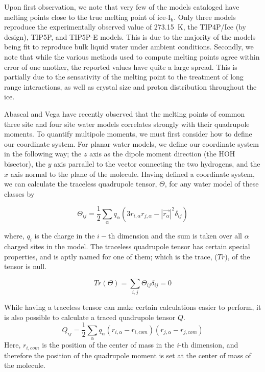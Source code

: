 Upon first observation, we note that very few of the models cataloged
have melting points close to the true melting point of
ice-I$_\mathrm{h}$.  Only three models reproduce the experimentally
observed value of 273.15~K, the TIP4P/Ice (by design), TIP5P, and
TIP5P-E models. This is due to the majority of the models being fit to
reproduce bulk liquid water under ambient conditions. Secondly, we note
that while the various methods used to compute melting points agree
within error of one another, the reported values have quite a large
spread. This is partially due to the sensativity of the melting point
to the treatment of long range interactions\cite{Arbuckle2002,
  Bryk2004}, as well as crystal size\cite{Pan2011} and proton
distribution throughout the ice.\cite{Louden2017}

Abascal and Vega have recently observed that the melting points of
common three site and four site water models correlates strongly with
their quadrupole
moments.\cite{Abascal2007,Abascal2007a,Abascal2007b,Abascal2007c} To
quantify multipole moments, we must first consider how to define our
coordinate system. For planar water models, we define our coordinate
system in the following way; the $z$ axis as the dipole moment
direction (the HOH bisector), the $y$ axis parrallel to the vector
connecting the two hydrogens, and the $x$ axis normal to the plane of
the molecule. Having defined a coordinate system, we can calculate the
traceless quadrupole tensor, $\Theta$, for any water model of these
classes by

\begin{equation}
\Theta_{ij} = \frac{1}{2} \sum_{\alpha}q_{\alpha}(3r_{i,\alpha}r_{j,\alpha}-|\vec{r_{\alpha}}|^{2}\delta_{ij})
\end{equation}

where, $q_i$ is the charge in the $i-$th dimension and the sum is
taken over all $\alpha$ charged sites in the model. The traceless
quadrupole tensor has certain special properties, and is aptly named
for one of them; which is the trace, ($Tr$), of the tensor is null.

\begin{equation}
Tr(\Theta) = \sum_{i,j}\Theta_{ij}\delta_{ij} = 0
\end{equation}

While having a traceless tensor can make certain calculations easier to 
perform, it is also possible to calculate a traced quadrupole tensor $Q$.
\begin{equation}
Q_{ij} = \frac{1}{2}\sum_{\alpha}q_{\alpha}(r_{i,\alpha}-r_{i,com})(r_{j,\alpha}-r_{j,com})
\end{equation}
Here, $r_{i,com}$ is the position of the center of mass in the $i$-th 
dimension, and therefore the position of the quadrupole moment is set at the 
center of mass of the molecule.

